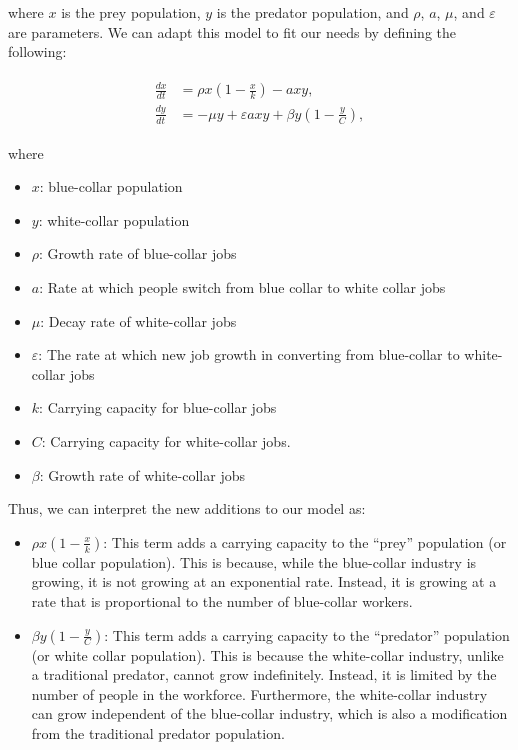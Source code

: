 \documentclass[11pt]{amsart}
\begin{document}
where $x$ is the prey population, $y$ is the predator population, and $\rho$, $a$, $\mu$, and $\varepsilon$ are parameters. 
We can adapt this model to fit our needs by defining the following:

\begin{align}
    \begin{split}
        \frac{dx}{dt} &= \rho x \left(1-\frac{x}{k}\right) - a x y, \\
        \frac{dy}{dt} &= -\mu y + \varepsilon a x y + \beta y \left(1-\frac{y}{C}\right),
    \end{split}
\end{align}

where 

\begin{itemize}
    \item $x$: blue-collar population
    \item $y$: white-collar population
    \item $\rho$: Growth rate of blue-collar jobs
    \item $a$: Rate at which people switch from blue collar to white collar jobs
    \item $\mu$: Decay rate of white-collar jobs
    \item $\varepsilon$: The rate at which new job growth in converting from blue-collar to white-collar jobs
    \item $k$: Carrying capacity for blue-collar jobs
    \item $C$: Carrying capacity for white-collar jobs.
    \item $\beta$: Growth rate of white-collar jobs
\end{itemize}

Thus, we can interpret the new additions to our model as:

\begin{itemize}
    \item $\rho x (1-\frac{x}{k})$: This term adds a carrying capacity to the ``prey'' population (or blue collar population). This is because, while the blue-collar industry is growing, it is not growing at an exponential rate. Instead, it is growing at a rate that is proportional to the number of blue-collar workers.
    \item $\beta y (1-\frac{y}{C})$: This term adds a carrying capacity to the ``predator'' population (or white collar population). This is because the white-collar industry, unlike a traditional predator, cannot grow indefinitely. Instead, it is limited by the number of people in the workforce. Furthermore, the white-collar industry can grow independent of the blue-collar industry, which is also a modification from the traditional predator population.
\end{itemize}
\end{document}
